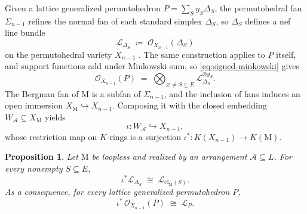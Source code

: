 \documentclass[11pt,a4paper,reqno]{amsart}
\theoremstyle{results}
\newtheorem{proposition}[thm]{Proposition}
\theoremstyle{definitions}
\def\calA{\mathcal{A}}
\newcommand{\cl}{\textrm{cl}}
\newcommand{\M}{\mathrm{M}}
\renewcommand{\emptyset}{\varnothing}
\newcommand{\cL}{\mathcal{L}}
\newcommand{\cO}{\mathcal{O}}
\begin{document}
Given a lattice generalized permutohedron
$P = \sum_{S} y_S \Delta_S$, the permutohedral fan $\Sigma_{n-1}$ refines the normal
fan of each standard simplex $\Delta_S$, so $\Delta_S$ defines a nef line bundle
\[
  \cL_{\Delta_S} \;\coloneqq\; \cO_{X_{n-1}}(\Delta_S)
\]
on the permutohedral variety $X_{n-1}$ \cite[Section 6.2]{cox2011toric}.  The same
construction applies to $P$ itself, and support functions add under Minkowski sum,
so \eqref{eq:signed-minkowski} gives
\begin{equation}\label{eq:OP}
  \cO_{X_{n-1}}(P) \;=\; \bigotimes_{\emptyset \ne S \subseteq E}
  \cL_{\Delta_S}^{\otimes y_S} .
\end{equation}
The Bergman
fan of $\M$ is a subfan of $\Sigma_{n-1}$, and the inclusion of fans induces an open
immersion $X_{\M} \hookrightarrow X_{n-1}$.
Composing it with the closed embedding
$W_{\calA} \subseteq X_{\M}$ \cite{katz2011realization} yields
\[
  \iota \colon W_{\calA} \hookrightarrow X_{n-1},
\]
whose restriction map on $K$-rings is a surjection $\iota^{*} \colon K(X_{n-1}) \to K(\M)$.

\begin{proposition}\label{prop:pullback}
  Let $\M$ be loopless and realized by an arrangement $\calA \subseteq L$.  For
  every nonempty $S \subseteq E$,
  \[
    \iota^{*} \cL_{\Delta_S} \;\cong\; \cL_{\cl_{\M}(S)} .
  \]
  As a consequence, for every lattice generalized permutohedron $P$,
  \[
    \iota^{*}\, \cO_{X_{n-1}}(P) \;\cong\; \cL_P .
  \]
\end{proposition}
\end{document}
